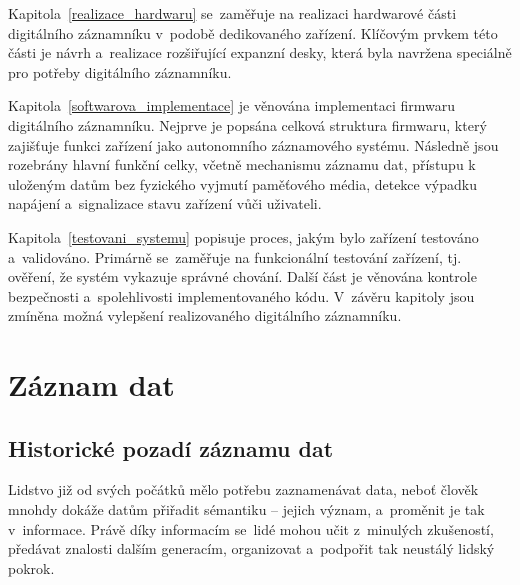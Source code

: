 Kapitola~\ref{realizace_hardwaru} se~zaměřuje na realizaci hardwarové části digitálního záznamníku v~podobě dedikovaného zařízení. Klíčovým prvkem této části je návrh a~realizace rozšiřující expanzní desky, která byla navržena speciálně pro potřeby digitálního záznamníku.


Kapitola~\ref{softwarova_implementace} je věnována implementaci firmwaru digitálního záznamníku. Nejprve je popsána celková struktura firmwaru, který zajišťuje funkci zařízení jako autonomního záznamového systému. Následně jsou rozebrány hlavní funkční celky, včetně mechanismu záznamu dat, přístupu k uloženým datům bez fyzického vyjmutí paměťového média, detekce výpadku napájení a~signalizace stavu zařízení vůči uživateli.

Kapitola~\ref{testovani_systemu} popisuje proces, jakým bylo zařízení testováno a~validováno. Primárně se~zaměřuje na funkcionální testování zařízení, tj. ověření, že systém vykazuje správné chování. Další část je věnována kontrole bezpečnosti a~spolehlivosti implementovaného kódu. V~závěru kapitoly jsou zmíněna možná vylepšení realizovaného digitálního záznamníku.


\chapter{Záznam dat}
\label{zaznam_dat}

\section{Historické pozadí záznamu dat}
\label{pocatky}
Lidstvo již od svých počátků mělo potřebu zaznamenávat data, neboť člověk mnohdy dokáže datům přiřadit sémantiku -- jejich význam, a~proměnit je tak v~informace. Právě díky informacím se~lidé mohou učit z~minulých zkušeností, předávat znalosti dalším generacím, organizovat a~podpořit tak neustálý lidský pokrok.

